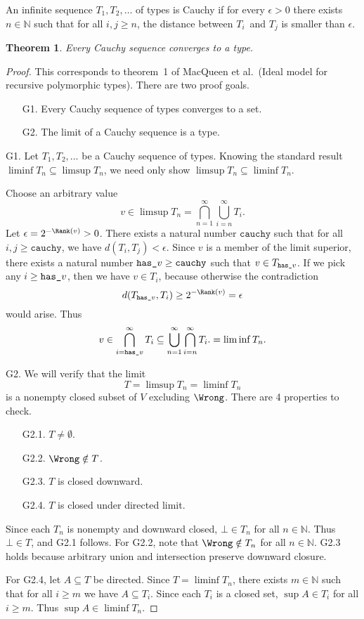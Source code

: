 \documentclass{amsart}
\newtheorem{theorem}[subsection]{Theorem}
\begin{document}

An infinite sequence $T_1,T_2,\ldots$ of types is Cauchy if for
every $\epsilon>0$ there exists $n\in\mathbb N$ such that for all
$i,j\ge n$, the distance between $T_i$~and $T_j$ is smaller than
$\epsilon$.

\begin{theorem}\label{cauchy}
Every Cauchy sequence converges to a type.
\end{theorem}

\begin{proof}
This corresponds to theorem~1 of MacQueen et al.\ (Ideal model
for recursive polymorphic types). There are two proof goals.
\begin{enumerate}
\item [G1.] Every Cauchy sequence of types converges to a set.
\item [G2.] The limit of a Cauchy sequence is a type.
\end{enumerate}

G1. Let $T_1,T_2,\ldots$ be a Cauchy sequence of types. Knowing
the standard result $\liminf T_n\subseteq\limsup T_n$, we need
only show $\limsup T_n\subseteq\liminf T_n$.

\def\Cauchy{\texttt{cauchy}}
\def\Hasv{{\texttt{has\textunderscore}v}}

Choose an arbitrary value
\[
v\in \limsup T_n = \bigcap_{n=1}^\infty\bigcup_{i = n}^\infty T_i.
\]
Let $\epsilon=2^{-\Rank(v)}>0$. There exists a natural number
$\Cauchy$ such that for all $i,j\ge\Cauchy$, we have
$d(T_i,T_j)<\epsilon$. Since $v$ is a member of the limit
superior, there exists a natural number $\Hasv\ge\Cauchy$ such
that $v\in T_\Hasv$. If we pick any $i\ge\Hasv$, then we have
$v\in T_i$, because otherwise the contradiction
\[
d(T_\Hasv, T_i)\ge2^{-\Rank(v)}=\epsilon
\]
would arise. Thus
\[
v\in
\bigcap_{i=\Hasv}^\infty T_i\subseteq
\bigcup_{n=1}^\infty\bigcap_{i = n}^\infty T_i.
=\liminf T_n.
\]

G2. We will verify that the limit
\[
T=\limsup T_n=\liminf T_n
\]
is a nonempty closed subset of $V$ excluding $\Wrong$. There are
4 properties to check.
\begin{enumerate}
\item [G2.1.] $T\neq\emptyset$.
\item [G2.2.] $\Wrong\notin T$.
\item [G2.3.] $T$ is closed downward.
\item [G2.4.] $T$ is closed under directed limit.
\end{enumerate}

Since each $T_n$ is nonempty and downward closed, $\bot\in T_n$
for all $n\in\mathbb N$. Thus $\bot\in T$, and G2.1 follows. For
G2.2, note that $\Wrong\notin T_n$ for all $n\in\mathbb N$. G2.3
holds because arbitrary union and intersection preserve
downward closure.

For G2.4, let $A\subseteq T$ be directed. Since $T=\liminf T_n$,
there exists $m\in\mathbb N$ such that for all $i\ge m$ we have
$A\subseteq T_i$. Since each $T_i$ is a closed set, $\sup A\in
T_i$ for all $i\ge m$. Thus $\sup A\in\liminf T_n$.
\end{proof}
\end{document}
